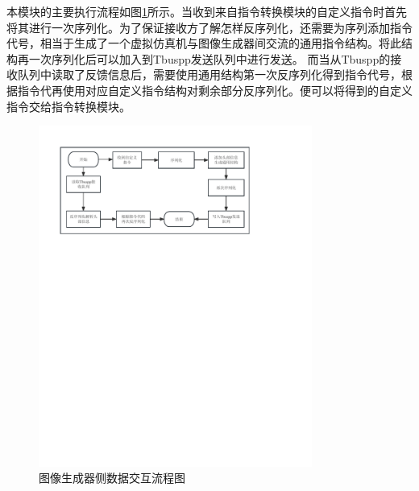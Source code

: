 本模块的主要执行流程如图\ref{module31}所示。当收到来自指令转换模块的自定义指令时首先将其进行一次序列化。为了保证接收方了解怎样反序列化，还需要为序列添加指令代号，相当于生成了一个虚拟仿真机与图像生成器间交流的通用指令结构。将此结构再一次序列化后可以加入到Tbuspp发送队列中进行发送。
 而当从Tbuspp的接收队列中读取了反馈信息后，需要使用通用结构第一次反序列化得到指令代号，根据指令代再使用对应自定义指令结构对剩余部分反序列化。便可以将得到的自定义指令交给指令转换模块。
 \begin{figure}[h!]
    \begin{center}
        \includegraphics[width=0.8\textwidth]{pictures/flowchart3.pdf}
        \caption{图像生成器侧数据交互流程图}
        \label{module31}
    \end{center}
\end{figure}
